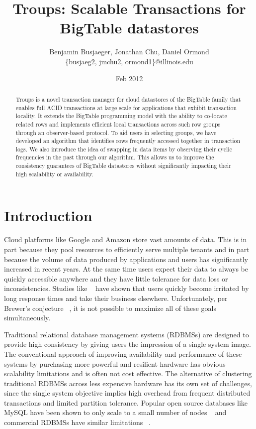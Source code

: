 \documentclass[10pt,final,journal]{IEEEtran}
\begin{document}
\title{Troups: Scalable Transactions for BigTable datastores}
\author{Benjamin Busjaeger, Jonathan Chu, Daniel Ormond \\
\{busjaeg2, jmchu2, ormond1\}@illinois.edu}
\date{Feb 2012}
\maketitle

\begin{abstract}
Troups is a novel transaction manager for cloud datastores of the BigTable family that enables full ACID transactions at large scale for applications that exhibit transaction locality. It extends the BigTable programming model with the ability to co-locate related rows and implements efficient local transactions across such row groups through an observer-based protocol. To aid users in selecting groups, we have developed an algorithm that identifies rows frequently accessed together in transaction logs. We also introduce the idea of swapping in data items by observing their cyclic frequencies in the past through our algorithm. This allows us to improve the consistency guarantees of BigTable datastores without significantly impacting their high scalability or availability.
\end{abstract}

\section{Introduction}
Cloud platforms like Google and Amazon store vast amounts of data. This is in part because they pool resources to efficiently serve multiple tenants and in part because the volume of data produced by applications and users has significantly increased in recent years. At the same time users expect their data to always be quickly accessible anywhere and they have little tolerance for data loss or inconsistencies. Studies like ~\cite{Ramsay:1998} have shown that users quickly become  irritated by long response times and take their business elsewhere. Unfortunately, per Brewer's conjecture ~\cite{gilbert2002brewer}, it is not possible to maximize all of these goals simultaneously.

Traditional relational database management systems (RDBMSs) are designed to provide high consistency by giving users the impression of a single system image. The conventional approach of improving availability and performance of these systems by purchasing more powerful and resilient hardware has obvious scalability limitations and is often not cost effective. The alternative of clustering traditional RDBMSs across less expensive hardware has its own set of challenges, since the single system objective implies high overhead from frequent distributed transactions and limited partition tolerance. Popular open source databases like MySQL have been shown to only scale to a small number of nodes ~\cite{Malkowski:2010:EAD:1774088.1774449} and commercial RDBMSs have similar limitations ~\cite{Campbell:2010:ESF:1807167.1807280}.
\end{document}
